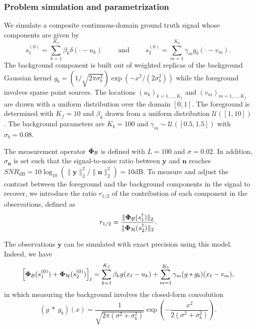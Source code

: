 \documentclass[12pt]{article}
\begin{document}
        \subsubsection{Problem simulation and parametrization}

            We simulate a composite continuous-domain ground truth signal whose components are given by 
            $$s_1^{(0)} = \sum_{k=1}^{K_f} \beta_ k \delta(\cdot - u_k) \qquad\text{ and }\qquad s_2^{(0)} = \sum_{m=1}^{K_b} \gamma_m g_b(\cdot - v_m).
            $$
            The background component is built out of weighted replicas of the background Gaussian kernel $g_b = (1/\sqrt{2\pi\sigma_b^2}) \exp{(-x^2/(2 \sigma_b^2))}$ while the foreground involves sparse point sources. The locations $(u_k)_{k=1, \dots, K_f}$ and $(v_m)_{m=1, \dots, K_f}$ are drawn with a uniform distribution over the domain $[0, 1]$. The foreground is determined with $K_f = 10$ and $\beta_k$ drawn from a uniform distribution $\mathcal{U}([1, 10])$. The background parameters are $K_b = 100$ and $\gamma_m \sim \mathcal{U}([0.5, 1.5])$ with $\sigma_b = 0.08$.
            
            The measurement operator $\bm{\Phi}_\mathcal{B}$ is defined with $L=100$ and $\sigma=0.02$. In addition, $\sigma_{\bm{n}}$ is set such that the signal-to-noise ratio between $\bm{y}$ and $\bm{n}$ reaches $SNR_\mathrm{dB} = 10 \log_{10}\left({\lVert \bm{y} \rVert_2^2}/{\lVert \bm{n} \rVert_2^2}\right) = 10$dB. To measure and adjust the contrast between the foreground and the background components in the signal to recover, we introduce the ratio $r_{1/2}$ of the contribution of each component in the observations, defined as
            \begin{equation}
                r_{1/2} = \frac{\lVert \bm{\Phi}_\mathcal{B} (s_1^\dagger) \rVert_2 }{\lVert \bm{\Phi}_\mathcal{H} (s_2^\dagger) \rVert_2 }.
            \end{equation}
    
            The observations $\bm{y}$ can be simulated with exact precision using this model. Indeed, we have
            $$
            \left[\bm{\Phi}_\mathcal{B}(s_1^{(0)}) + \bm{\Phi}_\mathcal{H}(s_2^{(0)})\right]_\ell = \sum_{k=1}^{K_f} \beta_k g(x_\ell - u_k) + \sum_{m=1}^{K_b} \gamma_m (g * g_b)(x_\ell - v_m),
            $$
            in which measuring the background involves the closed-form convolution
            $$
            (g\ *\ g_b)(x) = \frac{1}{\sqrt{2 \pi(\sigma^2 + \sigma_b^2)}} \exp{\left(-\frac{x^2}{2 (\sigma^2 + \sigma_b^2)}\right)}.
            $$
            
\end{document}
